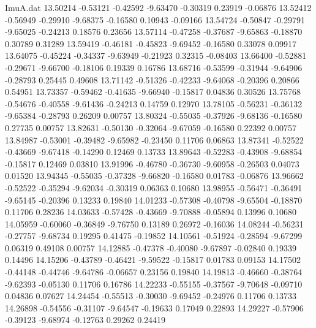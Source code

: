 \begin{filecontents}{ImuA.dat}
  13.50214   -0.53121   -0.42592   -9.63470   -0.30319    0.23919   -0.06876
  13.52412   -0.56949   -0.29910   -9.68375   -0.16580    0.10943   -0.09166
  13.54724   -0.50847   -0.29791   -9.65025   -0.24213    0.18576    0.23656
  13.57114   -0.47258   -0.37687   -9.65863   -0.18870    0.30789    0.31289
  13.59419   -0.46181   -0.45823   -9.69452   -0.16580    0.33078    0.09917
  13.64075   -0.45224   -0.34337   -9.63949   -0.21923    0.32315   -0.08403
  13.66400   -0.52881   -0.29671   -9.66700   -0.18106    0.19339    0.16786
  13.68716   -0.53599   -0.31944   -9.64906   -0.28793    0.25445    0.49608
  13.71142   -0.51326   -0.42233   -9.64068   -0.20396    0.20866    0.54951
  13.73357   -0.59462   -0.41635   -9.66940   -0.15817    0.04836    0.30526
  13.75768   -0.54676   -0.40558   -9.61436   -0.24213    0.14759    0.12970
  13.78105   -0.56231   -0.36132   -9.65384   -0.28793    0.26209    0.00757
  13.80324   -0.55035   -0.37926   -9.68136   -0.16580    0.27735    0.00757
  13.82631   -0.50130   -0.32064   -9.67059   -0.16580    0.22392    0.00757
  13.84987   -0.53001   -0.39482   -9.65982   -0.23450    0.11706    0.06863
  13.87341   -0.52522   -0.43669   -9.67418   -0.14290    0.12469    0.13733
  13.89643   -0.52283   -0.43908   -9.68854   -0.15817    0.12469    0.03810
  13.91996   -0.46780   -0.36730   -9.60958   -0.26503    0.04073    0.01520
  13.94345   -0.55035   -0.37328   -9.66820   -0.16580    0.01783   -0.06876
  13.96662   -0.52522   -0.35294   -9.62034   -0.30319    0.06363    0.10680
  13.98955   -0.56471   -0.36491   -9.65145   -0.20396    0.13233    0.19840
  14.01233   -0.57308   -0.40798   -9.65504   -0.18870    0.11706    0.28236
  14.03633   -0.57428   -0.43669   -9.70888   -0.05894    0.13996    0.10680
  14.05959   -0.60060   -0.36849   -9.76750    0.13189    0.26972   -0.16036
  14.08244   -0.56231   -0.27757   -9.68734    0.19295    0.41475   -0.19852
  14.10561   -0.51924   -0.28594   -9.67299    0.06319    0.49108    0.00757
  14.12885   -0.47378   -0.40080   -9.67897   -0.02840    0.19339    0.14496
  14.15206   -0.43789   -0.46421   -9.59522   -0.15817    0.01783    0.09153
  14.17502   -0.44148   -0.44746   -9.64786   -0.06657    0.23156    0.19840
  14.19813   -0.46660   -0.38764   -9.62393   -0.05130    0.11706    0.16786
  14.22233   -0.55155   -0.37567   -9.70648   -0.09710    0.04836    0.07627
  14.24454   -0.55513   -0.30030   -9.69452   -0.24976    0.11706    0.13733
  14.26898   -0.54556   -0.31107   -9.64547   -0.19633    0.17049    0.22893
  14.29227   -0.57906   -0.39123   -9.68974   -0.12763    0.29262    0.24419

\end{filecontents}

